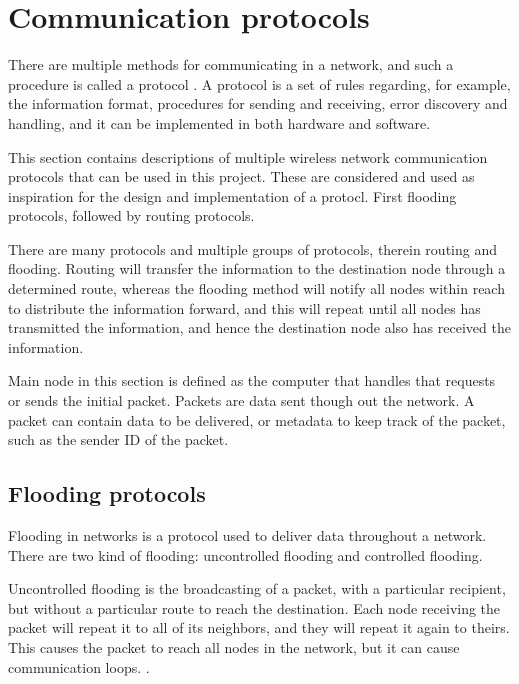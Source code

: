 \section{Communication protocols} \label{cha:comprot}
There are multiple methods for communicating in a network, and such a procedure is called a protocol \cite{protocol}. A protocol is a set of rules regarding, for example, the information format, procedures for sending and receiving, error discovery and handling, and it can be implemented in both hardware and software.

This section contains descriptions of multiple wireless network communication protocols that can be used in this project. These are considered and used as inspiration for the design and implementation of a protocl. First flooding protocols, followed by routing protocols.

There are many protocols and multiple groups of protocols, therein routing and flooding. 
Routing will transfer the information to the destination node through a determined route, whereas the flooding method will notify all nodes within reach to distribute the information forward, and this will repeat until all nodes has transmitted the information, and hence the destination node also has received the information.


Main node in this section is defined as the computer that handles that requests or sends the initial packet.
Packets are data sent though out the network. A packet can contain data to be delivered, or metadata to keep track of the packet, such as the sender ID of the packet.


\subsection{Flooding protocols}\label{cha:floodingSec}
Flooding in networks is a protocol used to deliver data throughout a network.
There are two kind of flooding: uncontrolled flooding and controlled flooding\cite{controlled_flooding}.

Uncontrolled flooding is the broadcasting of a packet, with a particular recipient, but without a particular route to reach the destination. Each node receiving the packet will repeat it to all of its neighbors, and they will repeat it again to theirs. This causes the packet to reach all nodes in the network, but it can cause communication loops. \cite{flooding}.

